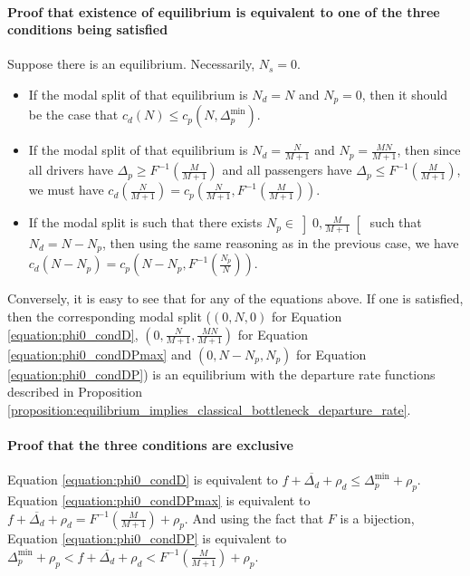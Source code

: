 \documentclass[english, a4paper]{article}
\theoremstyle{plain}
\theoremstyle{definition}
\theoremstyle{remark}
\begin{document}
\paragraph{Proof that existence of equilibrium is equivalent to one of the three conditions being satisfied}

Suppose there is an equilibrium. Necessarily, $N_s = 0$.
\begin{itemize}
    \item If the modal split of that equilibrium is $N_d = N$ and $N_p = 0$, then it should be the case that $c_d(N) \leq c_p(N, \Delta_p^{\text{min}})$.
    \item If the modal split of that equilibrium is $N_d = \frac{N}{M + 1}$ and $N_p = \frac{MN}{M + 1}$, then since all drivers have $\Delta_p \geq F^{-1} \left( \frac{M}{M + 1}\right)$ and all passengers have $\Delta_p \leq F^{-1} \left( \frac{M}{M + 1}\right)$, we must have $c_d\left(\frac{N}{M + 1} \right) = c_p\left(\frac{N}{M + 1}, F^{-1}\left(\frac{M}{M + 1}\right)\right)$.
    \item If the modal split is such that there exists $N_p \in \left] 0, \frac{M}{M + 1}\right[$ such that $N_d = N - N_p$, then using the same reasoning as in the previous case, we have $c_d(N - N_p) = c_p \left( N - N_p, F^{-1} \left( \frac{N_p}{N} \right)\right)$.
    
\end{itemize}

Conversely, it is easy to see that for any of the equations above. If one is satisfied, then the corresponding modal split ($(0, N, 0)$ for Equation \ref{equation:phi0_condD}, $\left(0, \frac{N}{M + 1}, \frac{MN}{M + 1}\right)$ for Equation \ref{equation:phi0_condDPmax} and $(0, N - N_p, N_p)$ for Equation \ref{equation:phi0_condDP}) is an equilibrium with the departure rate functions described in Proposition \ref{proposition:equilibrium_implies_classical_bottleneck_departure_rate}.

\paragraph{Proof that the three conditions are exclusive}

Equation \ref{equation:phi0_condD} is equivalent to $f + \overline{\Delta_d} + \rho_d \leq \Delta_p^{\text{min}} + \rho_p$. Equation \ref{equation:phi0_condDPmax} is equivalent to $f + \overline{\Delta_d} + \rho_d = F^{-1}\left( \frac{M}{M + 1} \right) + \rho_p$. And using the fact that $F$ is a bijection, Equation \ref{equation:phi0_condDP} is equivalent to $\Delta_p^{\text{min}} + \rho_p < f + \overline{\Delta_d} + \rho_d < F^{-1}\left( \frac{M}{M + 1} \right) + \rho_p$.
\end{document}
